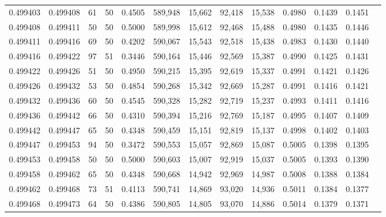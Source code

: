 \begin{tabular}{rrrrrrrrrrrrr}
0.499403 & 0.499408 &    61 &  50 &                                     0.4505 & 589,948 &  15,662 &  92,418 &  15,538 & 0.4980 & 0.1439 & 0.1451 \\
0.499408 & 0.499411 &    50 &  50 &                                     0.5000 & 589,998 &  15,612 &  92,468 &  15,488 & 0.4980 & 0.1435 & 0.1446 \\
0.499411 & 0.499416 &    69 &  50 &                                     0.4202 & 590,067 &  15,543 &  92,518 &  15,438 & 0.4983 & 0.1430 & 0.1440 \\
0.499416 & 0.499422 &    97 &  51 &                                     0.3446 & 590,164 &  15,446 &  92,569 &  15,387 & 0.4990 & 0.1425 & 0.1431 \\
0.499422 & 0.499426 &    51 &  50 &                                     0.4950 & 590,215 &  15,395 &  92,619 &  15,337 & 0.4991 & 0.1421 & 0.1426 \\
0.499426 & 0.499432 &    53 &  50 &                                     0.4854 & 590,268 &  15,342 &  92,669 &  15,287 & 0.4991 & 0.1416 & 0.1421 \\
0.499432 & 0.499436 &    60 &  50 &                                     0.4545 & 590,328 &  15,282 &  92,719 &  15,237 & 0.4993 & 0.1411 & 0.1416 \\
0.499436 & 0.499442 &    66 &  50 &                                     0.4310 & 590,394 &  15,216 &  92,769 &  15,187 & 0.4995 & 0.1407 & 0.1409 \\
0.499442 & 0.499447 &    65 &  50 &                                     0.4348 & 590,459 &  15,151 &  92,819 &  15,137 & 0.4998 & 0.1402 & 0.1403 \\
0.499447 & 0.499453 &    94 &  50 &                                     0.3472 & 590,553 &  15,057 &  92,869 &  15,087 & 0.5005 & 0.1398 & 0.1395 \\
0.499453 & 0.499458 &    50 &  50 &                                     0.5000 & 590,603 &  15,007 &  92,919 &  15,037 & 0.5005 & 0.1393 & 0.1390 \\
0.499458 & 0.499462 &    65 &  50 &                                     0.4348 & 590,668 &  14,942 &  92,969 &  14,987 & 0.5008 & 0.1388 & 0.1384 \\
0.499462 & 0.499468 &    73 &  51 &                                     0.4113 & 590,741 &  14,869 &  93,020 &  14,936 & 0.5011 & 0.1384 & 0.1377 \\
0.499468 & 0.499473 &    64 &  50 &                                     0.4386 & 590,805 &  14,805 &  93,070 &  14,886 & 0.5014 & 0.1379 & 0.1371 \\

\end{tabular}
